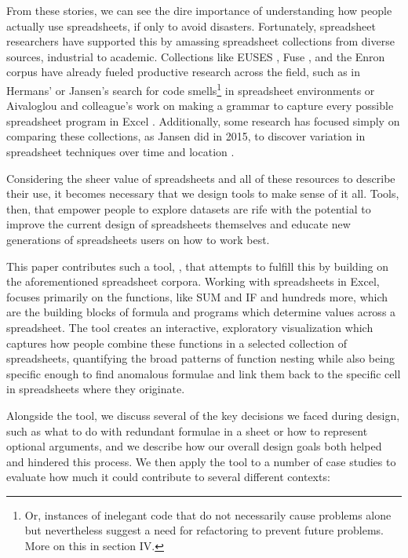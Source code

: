 \documentclass[conference]{IEEEtran}
\begin{document}
	From these stories, we can see the dire importance of understanding how people
	actually use spreadsheets, if only to avoid disasters. Fortunately, spreadsheet
	researchers have supported this by amassing spreadsheet collections from
	diverse sources, industrial to academic. Collections like EUSES
	\cite{fisher2005euses}, Fuse \cite{barik2015fuse}, and the Enron corpus
	\cite{hermans2015enron} have already fueled productive research across the
	field, such as in Hermans' \cite{hermans2012detecting} or Jansen's
	\cite{jansen2015code} search for code smells\footnote{Or, instances of
		inelegant code that do not necessarily cause problems alone but nevertheless
		suggest a need for refactoring to prevent future problems. More on this in
		section IV.} in spreadsheet environments or Aivaloglou and colleague's work on
	making a grammar to capture every possible spreadsheet program in Excel
	\cite{aivaloglou2015grammar}. Additionally, some research has focused simply on
	comparing these collections, as Jansen did in 2015, to discover variation in
	spreadsheet techniques over time and location \cite{jansen2015enron}.
	
	Considering the sheer value of spreadsheets and all of these resources to
	describe their use, it becomes necessary that we design tools to make sense of
	it all. Tools, then, that empower people to explore datasets are rife with the
	potential to improve the current design of spreadsheets themselves and educate
	new generations of spreadsheets users on how to work best.
	
	This paper contributes such a tool, \toolname, that attempts to fulfill this by
	building on the aforementioned spreadsheet corpora. Working with spreadsheets
	in Excel, \toolname focuses primarily on the functions, like SUM and IF and
	hundreds more, which are the building blocks of formula and programs which
	determine values across a spreadsheet. The tool creates an interactive,
	exploratory visualization which captures how people combine these functions in
	a selected collection of spreadsheets, quantifying the broad patterns of
	function nesting while also being specific enough to find anomalous formulae
	and link them back to the specific cell in spreadsheets where they originate.
	\par
	
	Alongside the tool, we discuss several of the key decisions we faced during
	design, such as what to do with redundant formulae in a sheet or how to
	represent optional arguments, and we describe how our overall design goals both
	helped and hindered this process. We then apply the tool to a number of case
	studies to evaluate how much it could contribute to several different contexts:
	
\end{document}
